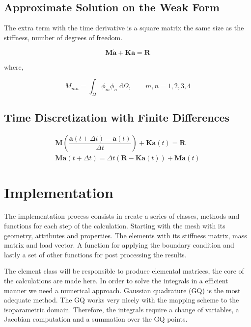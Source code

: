 \documentclass[10pt, a4paper]{article}
\begin{document}
\subsection{Approximate Solution on the Weak Form}

The extra term with the time derivative is a square matrix the same size as the stiffness, number of degrees of freedom.

\begin{equation*}
\mathbf{M \dot{a} +  K a = R}
\end{equation*}

where,

\begin{equation*}
M_{mn} = \int_\Omega \phi_m \phi_n \; \mathrm{d}\Omega, \qquad m,n = 1,2,3,4
\end{equation*}



\subsection{Time Discretization with Finite Differences}

\begin{align*}
\mathbf{M} \left( \dfrac{\mathbf{a}(t+\Delta t) - \mathbf{a}(t)}{\Delta t}\right) + \mathbf{Ka}(t)  =\mathbf{R} \\
\mathbf{M} \mathbf{a}(t+\Delta t) = \Delta t (\mathbf{R} - \mathbf{Ka}(t)) + \mathbf{Ma}(t)
\end{align*}



\section{Implementation}

The implementation process consists in create a series of classes, methods and functions for each step of the calculation. Starting with the mesh with its geometry, attributes and properties. The elements with its stiffness matrix, mass matrix and load vector. A function for applying the boundary condition and lastly a set of other functions for post processing the results.


The element class will be responsible to produce elemental matrices, the core of the calculations are made here. In order to solve the integrals in a efficient manner we need a numerical approach. Gaussian quadrature (GQ) is the most adequate method. The GQ works very nicely with the mapping scheme to the isoparametric domain. Therefore, the integrals require a change of variables, a Jacobian computation and a summation over the GQ points.
\end{document}
